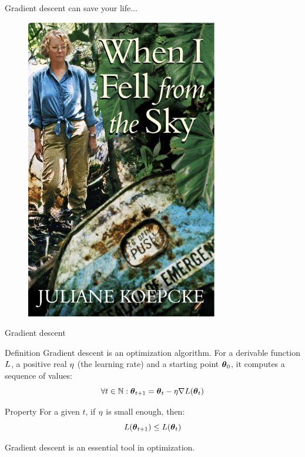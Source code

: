 \documentclass[xcolor=pdftex,dvipsnames,table,mathserif]{beamer}
\begin{document}
\begin{frame}{Gradient descent can save your life...}

  \pause

  \begin{figure}[ht]
    \centering
    \includegraphics[height=0.6\textheight]{koepcke.jpg}
  \end{figure}

\end{frame}


\begin{frame}{Gradient descent}

  \begin{block}{Definition}
    Gradient descent is an optimization algorithm. For a derivable function $L$, a positive real $\eta$ (the \alert{learning rate}) and a starting point $\boldsymbol{\theta}_0$, it computes a sequence of values:
    \[
    \forall t \in \mathbb{N}: \boldsymbol{\theta}_{t+1} = \boldsymbol{\theta}_t - \eta \nabla L(\boldsymbol{\theta}_t)
    \]
  \end{block}

  \begin{block}{Property}
    For a given $t$, if $\eta$ is small enough, then:
    \[
    L(\boldsymbol{\theta}_{t+1}) \leq L(\boldsymbol{\theta}_t)
    \]
  \end{block}

  Gradient descent is an essential tool in optimization.

\end{frame}
\end{document}
